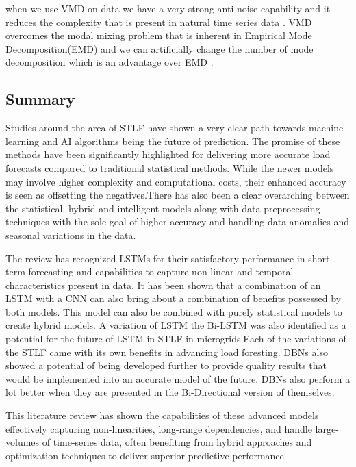 when we use VMD on data we have a very strong anti noise capability and it reduces the complexity that is present in natural time series data  \cite{huang2023two}. VMD overcomes the modal mixing problem that is inherent in Empirical Mode Decomposition(EMD) and we can artificially change the number of mode decomposition which is an advantage over EMD \cite{huang2023two}. 


\subsection{Summary}

Studies around the area of STLF have shown a very clear path towards machine learning and AI algorithms being the future of prediction. The promise of these methods have been significantly highlighted for delivering more accurate load forecasts compared to traditional statistical methods. While the newer models may involve higher complexity and computational costs, their enhanced accuracy is seen as offsetting the negatives.There has also been a clear overarching between the statistical, hybrid and intelligent models along with data preprocessing techniques with the sole goal of higher accuracy and handling data anomalies and seasonal variations in the data.
 
The review has recognized LSTMs for their satisfactory performance in short term forecasting and capabilities to capture non-linear and temporal characteristics present in data. It has been shown that a combination of an LSTM with a CNN can also bring about a combination of benefits possessed by both models. This model can also be combined with purely statistical models to create hybrid models.  A variation of LSTM the Bi-LSTM was also identified as a potential for the future of LSTM in STLF in microgrids.Each of the variations of the STLF came with its own benefits in advancing load foresting. DBNs also showed a potential of being developed further to provide quality results that would be implemented into an accurate model of the future. DBNs also perform a lot better when they are presented in the Bi-Directional version of themselves.

This literature review has shown the capabilities of these advanced models effectively capturing non-linearities, long-range dependencies, and handle large-volumes of  time-series data, often benefiting from hybrid approaches and optimization techniques to deliver superior predictive performance.